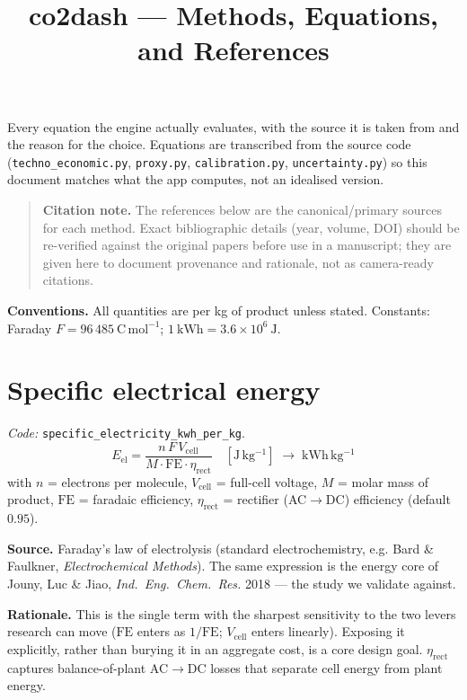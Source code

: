 \documentclass[11pt,a4paper]{article}
\title{\textbf{co2dash --- Methods, Equations, and References}}
\author{}
\date{}
\newcommand{\FE}{\mathrm{FE}}
\newcommand{\kgi}{\mathrm{kg^{-1}}}
\begin{document}
\maketitle
\vspace{-2.5em}

\noindent Every equation the engine actually evaluates, with the source it is
taken from and the reason for the choice. Equations are transcribed from the
source code (\texttt{techno\_economic.py}, \texttt{proxy.py},
\texttt{calibration.py}, \texttt{uncertainty.py}) so this document matches what
the app computes, not an idealised version.

\begin{quote}
\small\textbf{Citation note.} The references below are the canonical/primary
sources for each method. Exact bibliographic details (year, volume, DOI) should be
re-verified against the original papers before use in a manuscript; they are given
here to document provenance and rationale, not as camera-ready citations.
\end{quote}

\noindent\textbf{Conventions.} All quantities are per kg of product unless
stated. Constants: Faraday $F = 96\,485~\mathrm{C\,mol^{-1}}$;
$1~\mathrm{kWh} = 3.6\times10^{6}~\mathrm{J}$.

\hrulefill

\section{Specific electrical energy}
\emph{Code: }\texttt{specific\_electricity\_kwh\_per\_kg}.
\begin{equation}
E_\mathrm{el} = \frac{n\,F\,V_\mathrm{cell}}{M \cdot \FE \cdot \eta_\mathrm{rect}}
\quad[\mathrm{J\,\kgi}] \;\longrightarrow\; \mathrm{kWh\,\kgi}
\end{equation}
with $n$ = electrons per molecule, $V_\mathrm{cell}$ = full-cell voltage, $M$ =
molar mass of product, $\FE$ = faradaic efficiency, $\eta_\mathrm{rect}$ =
rectifier (AC$\to$DC) efficiency (default $0.95$).

\textbf{Source.} Faraday's law of electrolysis (standard electrochemistry, e.g.
Bard \& Faulkner, \emph{Electrochemical Methods}). The same expression is the
energy core of Jouny, Luc \& Jiao, \emph{Ind.\ Eng.\ Chem.\ Res.} 2018 --- the
study we validate against.

\textbf{Rationale.} This is the single term with the sharpest sensitivity to the
two levers research can move ($\FE$ enters as $1/\FE$; $V_\mathrm{cell}$ enters
linearly). Exposing it explicitly, rather than burying it in an aggregate cost, is
a core design goal. $\eta_\mathrm{rect}$ captures balance-of-plant AC$\to$DC
losses that separate cell energy from plant energy.
\end{document}
